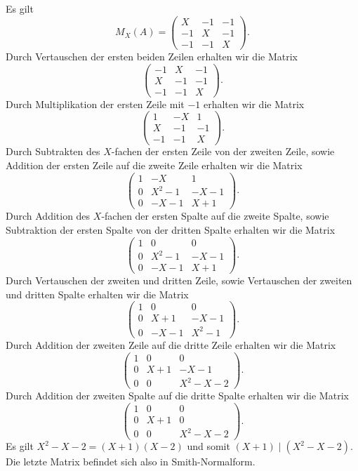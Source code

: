 \section{}

Es gilt
\[
    M_X(A)
  = \begin{pmatrix}
       X  & -1  & -1  \\
      -1  &  X  & -1  \\
      -1  & -1  &  X
    \end{pmatrix}.
\]
Durch Vertauschen der ersten beiden Zeilen erhalten wir die Matrix
\[
  \begin{pmatrix}
    -1  &  X  & -1  \\
     X  & -1  & -1  \\
    -1  & -1  &  X
  \end{pmatrix}.
\]
Durch Multiplikation der ersten Zeile mit $-1$ erhalten wir die Matrix
\[
  \begin{pmatrix}
     1  & -X  &  1  \\
     X  & -1  & -1  \\
    -1  & -1  &  X
  \end{pmatrix}.
\]
Durch Subtrakten des $X$-fachen der ersten Zeile von der zweiten Zeile, sowie Addition der ersten Zeile auf die zweite Zeile erhalten wir die Matrix
\[
  \begin{pmatrix}
    1 &    -X   &    1  \\
    0 & X^2  -1 & -X-1  \\
    0 &    -X-1 &  X+1
  \end{pmatrix}.
\]
Durch Addition des $X$-fachen der ersten Spalte auf die zweite Spalte, sowie Subtraktion der ersten Spalte von der dritten Spalte erhalten wir die Matrix
\[
  \begin{pmatrix}
    1 &       0 &    0  \\
    0 & X^2  -1 & -X-1  \\
    0 &    -X-1 &  X+1
  \end{pmatrix}.
\]
Durch Vertauschen der zweiten und dritten Zeile, sowie Vertauschen der zweiten und dritten Spalte erhalten wir die Matrix
\[
  \begin{pmatrix}
    1 &    0  &        0  \\
    0 &  X+1  &     -X-1  \\
    0 & -X-1  &  X^2  -1
  \end{pmatrix}.
\]
Durch Addition der zweiten Zeile auf die dritte Zeile erhalten wir die Matrix
\[
  \begin{pmatrix}
    1 &    0  &        0  \\
    0 &  X+1  &     -X-1  \\
    0 &    0  &  X^2-X-2
  \end{pmatrix}.
\]
Durch Addition der zweiten Spalte auf die dritte Spalte erhalten wir die Matrix
\[
  \begin{pmatrix}
    1 &    0  &        0  \\
    0 &  X+1  &        0  \\
    0 &    0  &  X^2-X-2
  \end{pmatrix}.
\]
Es gilt $X^2 - X - 2 = (X + 1)(X - 2)$ und somit $(X + 1) \mid (X^2 - X - 2)$.
Die letzte Matrix befindet sich also in Smith-Normalform.

